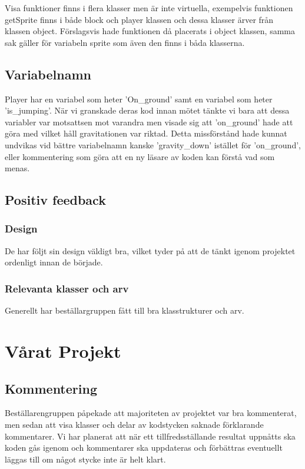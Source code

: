 \documentclass{TDP005mall}
\begin{document}
Visa funktioner finns i flera klasser men är inte virtuella, exempelvis funktionen getSprite finns i både block och player klassen och dessa klasser ärver från klassen object.
Förslagsvis hade funktionen då placerats i object klassen, samma sak gäller för variabeln sprite som även den finns i båda klasserna.

\subsection{Variabelnamn}
Player har en variabel som heter 'On\_ground' samt en variabel som heter 'is\_jumping'. När vi granskade deras kod innan mötet tänkte vi bara att dessa variabler var motsattsen mot varandra men visade sig att 'on\_ground' hade att göra med vilket håll gravitationen var riktad. Detta missförstånd hade kunnat undvikas vid bättre variabelnamn kanske 'gravity\_down' istället för 'on\_ground', eller kommentering som göra att en ny läsare av koden kan förstå vad som menas.

\subsection{Positiv feedback}

\subsubsection{Design}
De har följt sin design väldigt bra, vilket tyder på att de tänkt igenom projektet ordenligt innan de började.

\subsubsection{Relevanta klasser och arv}
Generellt har beställargruppen fått till bra klasstrukturer och arv.



\section{Vårat Projekt}
\subsection{Kommentering}
Beställarengruppen påpekade att majoriteten av projektet var bra kommenterat, men sedan att visa klasser och delar av kodstycken saknade förklarande kommentarer.
Vi har planerat att när ett tillfredsställande resultat uppnåtts ska koden gås igenom och kommentarer ska uppdateras och förbättras eventuellt läggas till om något stycke inte är helt klart.
\end{document}
